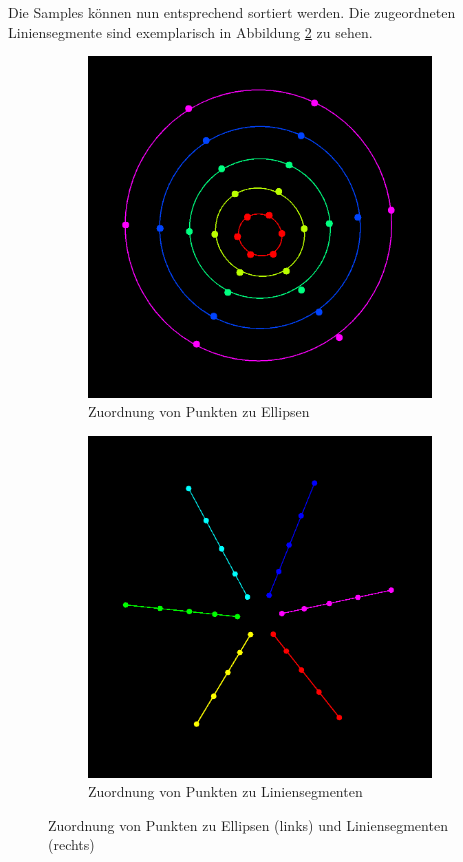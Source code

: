 Die Samples können nun entsprechend sortiert werden. Die zugeordneten Liniensegmente sind exemplarisch in Abbildung \ref{fig:lineMapping} zu sehen. 


\begin{figure}[!htb]
	\centering
	\begin{subfigure}{.5\textwidth}
		\centering
		\includegraphics[width=.9\textwidth]{images/ellipseMapping.png}
		\caption{Zuordnung von Punkten zu Ellipsen}
		\label{fig:ellipseMapping}
	\end{subfigure}%
	\begin{subfigure}{.5\textwidth}
		\centering
		\includegraphics[width=.9\textwidth]{images/lineMapping.png}
		\caption{Zuordnung von Punkten zu Liniensegmenten}
		\label{fig:lineMapping}
	\end{subfigure}
	\caption{Zuordnung von Punkten zu Ellipsen (links) und Liniensegmenten (rechts)}
	\label{fig:mapping}
\end{figure}


